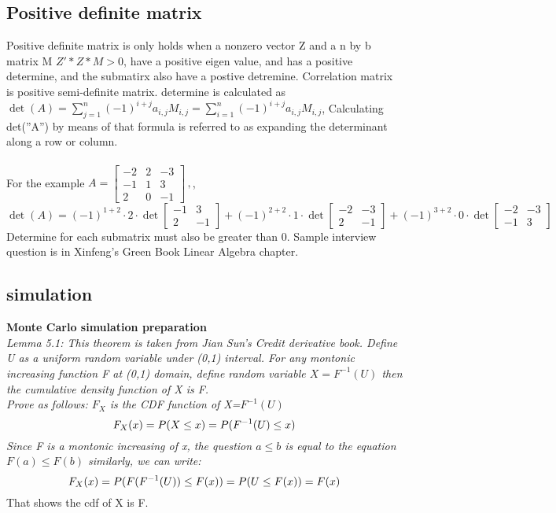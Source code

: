 \documentclass[a4paper,11pt]{article}
\begin{document}
\subsection {Positive definite matrix}
Positive definite matrix is only holds when a nonzero vector Z and a n by b matrix M $Z'*Z*M>0$, have a positive eigen value, and has a positive determine, and the  submatirx also have a postive detremine. Correlation matrix is positive semi-definite matrix.
determine is calculated as $\det(A) = \sum_{j=1}^n (-1)^{i+j} a_{i,j} M_{i,j} = \sum_{i=1}^n (-1)^{i+j} a_{i,j} M_{i,j}$, Calculating det(''A'') by means of that formula is referred to as expanding the determinant along a row or column.\\\\
For the example
$A = \begin{bmatrix}-2&2&-3\\
-1& 1& 3\\
2 &0 &-1\end{bmatrix} \,,$, $\det(A)=(-1)^{1+2}\cdot 2 \cdot \det \begin{bmatrix}-1&3\\ 2 &-1\end{bmatrix} + (-1)^{2+2}\cdot 1 \cdot \det \begin{bmatrix}-2&-3\\ 2&-1\end{bmatrix} + (-1)^{3+2}\cdot 0 \cdot \det \begin{bmatrix}-2&-3\\ -1&3\end{bmatrix}$\\
Determine for each submatrix must also be greater than 0. Sample interview question is in Xinfeng's Green Book Linear Algebra chapter.\\
\subsection{simulation}
{\bf Monte Carlo simulation preparation}\\
{\em Lemma 5.1: This theorem is taken from Jian Sun's Credit derivative book. Define U as a uniform random variable under (0,1) interval. For any montonic increasing function F at (0,1) domain, define random variable $X=F^{-1}(U)$ then the cumulative density function of X is F.\\
Prove as follows: $F_X$ is the CDF function of X=$F^{-1}(U)$
$$
F_X(x)=P(X \leq x)=P(F^{-1}(U)\leq x)\\
$$
Since F is a montonic increasing of x, the question $a\leq b$ is equal to the equation $F(a) \leq F(b)$
similarly, we can write:\\
$$
F_X(x)=P(F(F^{-1}(U)) \leq F(x)) \\=P(U \leq F(x)) \\=F(x)
$$
} That shows the cdf of X is F.\\
\end{document}
